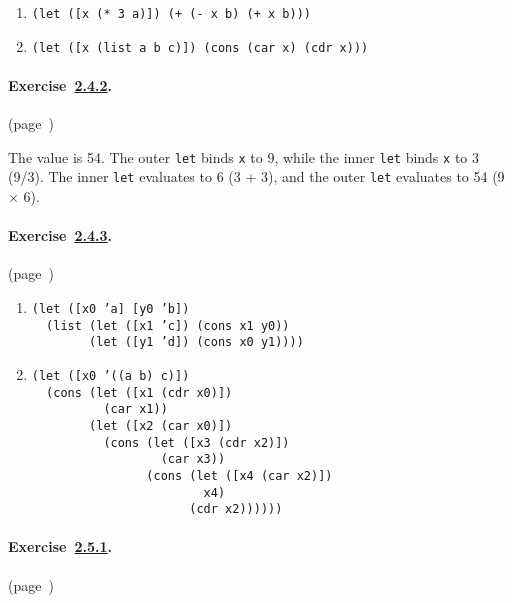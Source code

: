    
 
 \begin{enumerate}[\it a. ]
\item \texttt{(let ([x (* 3 a)]) (+ (- x b) (+ x b)))} \item \texttt{(let ([x (list a b c)]) (cons (car x) (cdr x)))} \end{enumerate}
 


\paragraph{Exercise \hyperref[start_g19]{2.4.2}. }(page \pageref{start_s58})

  The value is 54. The outer \texttt{let} binds \texttt{x} to 9, while the inner \texttt{let} binds \texttt{x} to 3 (9/3). The inner \texttt{let} evaluates to 6 (3 + 3), and the outer \texttt{let} evaluates to 54 (9 \(\times\) 6). 


\paragraph{Exercise \hyperref[start_g20]{2.4.3}. }(page \pageref{start_s59})

   
 
 \begin{enumerate}[\it a. ]
\item 
\begin{alltt}
(let ([x0 'a] [y0 'b])
   (list (let ([x1 'c]) (cons x1 y0))
         (let ([y1 'd]) (cons x0 y1))))
\end{alltt}

\item 
\begin{alltt}
(let ([x0 '((a b) c)])
   (cons (let ([x1 (cdr x0)])
           (car x1))
         (let ([x2 (car x0)])
           (cons (let ([x3 (cdr x2)])
                   (car x3))
                 (cons (let ([x4 (car x2)])
                         x4)
                       (cdr x2))))))
\end{alltt}

\end{enumerate}
 


\paragraph{Exercise \hyperref[start_g22]{2.5.1}. }(page \pageref{start_s72})

   
 
